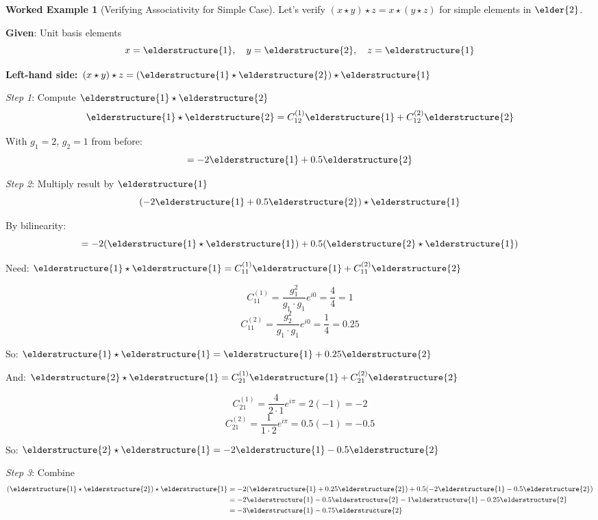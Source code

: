 \documentclass[12pt,a4paper]{article}
\theoremstyle{definition}
\newtheorem{example}{Worked Example}[section]
\theoremstyle{remark}
\begin{document}
\begin{example}[Verifying Associativity for Simple Case]
Let's verify $(x \star y) \star z = x \star (y \star z)$ for simple elements in $\elder{2}$.

\textbf{Given}: Unit basis elements
$$x = \elderstructure{1}, \quad y = \elderstructure{2}, \quad z = \elderstructure{1}$$

\textbf{Left-hand side: $(x \star y) \star z = (\elderstructure{1} \star \elderstructure{2}) \star \elderstructure{1}$}

\textit{Step 1}: Compute $\elderstructure{1} \star \elderstructure{2}$
$$\elderstructure{1} \star \elderstructure{2} = C_{12}^{(1)} \elderstructure{1} + C_{12}^{(2)} \elderstructure{2}$$

With $g_1 = 2$, $g_2 = 1$ from before:
$$= -2\elderstructure{1} + 0.5\elderstructure{2}$$

\textit{Step 2}: Multiply result by $\elderstructure{1}$
$$(-2\elderstructure{1} + 0.5\elderstructure{2}) \star \elderstructure{1}$$

By bilinearity:
$$= -2(\elderstructure{1} \star \elderstructure{1}) + 0.5(\elderstructure{2} \star \elderstructure{1})$$

Need: $\elderstructure{1} \star \elderstructure{1} = C_{11}^{(1)}\elderstructure{1} + C_{11}^{(2)}\elderstructure{2}$

$$C_{11}^{(1)} = \frac{g_1^2}{g_1 \cdot g_1} e^{i0} = \frac{4}{4} = 1$$
$$C_{11}^{(2)} = \frac{g_2^2}{g_1 \cdot g_1} e^{i0} = \frac{1}{4} = 0.25$$

So: $\elderstructure{1} \star \elderstructure{1} = \elderstructure{1} + 0.25\elderstructure{2}$

And: $\elderstructure{2} \star \elderstructure{1} = C_{21}^{(1)}\elderstructure{1} + C_{21}^{(2)}\elderstructure{2}$

$$C_{21}^{(1)} = \frac{4}{2 \cdot 1} e^{i\pi} = 2(-1) = -2$$
$$C_{21}^{(2)} = \frac{1}{1 \cdot 2} e^{i\pi} = 0.5(-1) = -0.5$$

So: $\elderstructure{2} \star \elderstructure{1} = -2\elderstructure{1} - 0.5\elderstructure{2}$

\textit{Step 3}: Combine
\begin{align}
(\elderstructure{1} \star \elderstructure{2}) \star \elderstructure{1} &= -2(\elderstructure{1} + 0.25\elderstructure{2}) + 0.5(-2\elderstructure{1} - 0.5\elderstructure{2}) \\
&= -2\elderstructure{1} - 0.5\elderstructure{2} - 1\elderstructure{1} - 0.25\elderstructure{2} \\
&= -3\elderstructure{1} - 0.75\elderstructure{2}
\end{align}


\end{example}
\end{document}
